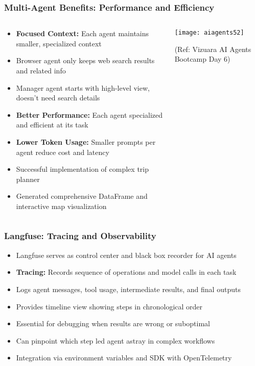 \begin{frame}[fragile]\frametitle{Multi-Agent Benefits: Performance and Efficiency}
\begin{columns}
    \begin{column}[T]{0.6\linewidth}
      \begin{itemize}
		\item \textbf{Focused Context:} Each agent maintains smaller, specialized context
		\item Browser agent only keeps web search results and related info
		\item Manager agent starts with high-level view, doesn't need search details
		\item \textbf{Better Performance:} Each agent specialized and efficient at its task
		\item \textbf{Lower Token Usage:} Smaller prompts per agent reduce cost and latency
		\item Successful implementation of complex trip planner
		\item Generated comprehensive DataFrame and interactive map visualization
	  \end{itemize}
    \end{column}
    \begin{column}[T]{0.4\linewidth}
		\begin{center}
		\texttt{[image: aiagents52]}
		
		{\tiny (Ref: Vizuara AI Agents Bootcamp Day 6)}
		\end{center}	
    \end{column}
  \end{columns}
\end{frame}

\begin{frame}[fragile]\frametitle{Langfuse: Tracing and Observability}

      \begin{itemize}
		\item Langfuse serves as control center and black box recorder for AI agents
		\item \textbf{Tracing:} Records sequence of operations and model calls in each task
		\item Logs agent messages, tool usage, intermediate results, and final outputs
		\item Provides timeline view showing steps in chronological order
		\item Essential for debugging when results are wrong or suboptimal
		\item Can pinpoint which step led agent astray in complex workflows
		\item Integration via environment variables and SDK with OpenTelemetry
	  \end{itemize}

\end{frame}

